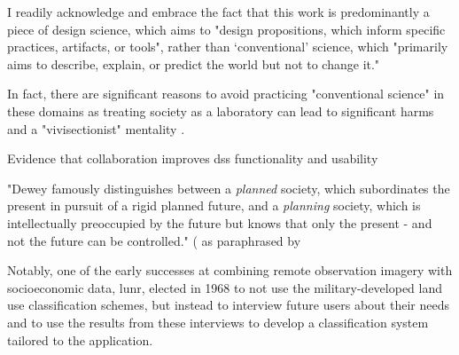 I readily acknowledge and embrace the fact that this work is predominantly a piece of design science, which aims to "design propositions, which inform specific practices, artifacts, or tools", rather than `conventional' science, which "primarily aims to describe, explain, or predict the world but not to change it." \cite{goodspeedScenarioPlanningCities2020}

In fact, there are significant reasons to avoid practicing "conventional science" in these domains as treating society as a laboratory can lead to significant harms and a "vivisectionist" mentality \cite{banandynuriModernMedicineIts1990}.

Evidence that collaboration improves \ac{dss} functionality and usability \cite{goodspeedDeathLifeCollaborative2016, vonkSociotechnicalPSSDevelopment2010, brommelstroetPlanningSupportSystems2010, ulibarriCollaborativeModelDevelopment2018} 

"Dewey famously distinguishes between a \textit{planned} society, which subordinates the present in pursuit of a rigid planned future, and a \textit{planning} society, which is intellectually preoccupied by the future but knows that only the present - and not the future can be controlled." (\cite{deweyHumanNatureConduct2007} as paraphrased by \cite{goodspeedScenarioPlanningCities2020}

Notably, one of the early successes at combining remote observation imagery with socioeconomic data, \ac{lunr}, elected in 1968 to not use the military-developed land use classification schemes, but instead to interview future users about their needs and to use the results from these interviews to develop a classification system tailored to the application. 





